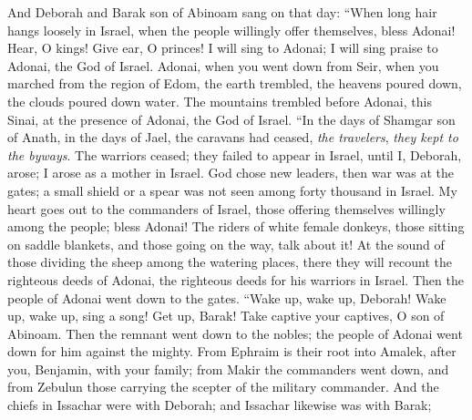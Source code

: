 \begin{biblechapter} %
 And Deborah and Barak son of Abinoam sang on that day:
\verse “When long hair hangs loosely in Israel, 
when the people willingly offer themselves, 
bless Adonai!
\verse Hear, O kings! Give ear, O princes! 
I will sing to Adonai; 
I will sing praise to Adonai, 
the God of Israel.
\verse Adonai, when you went down from Seir, 
when you marched from the region of Edom, 
the earth trembled, the heavens poured down, 
the clouds poured down water.
\verse The mountains trembled before Adonai, 
this Sinai, at the presence of Adonai, the God of Israel.
\verse “In the days of Shamgar son of Anath, 
in the days of Jael, the caravans had ceased, 
\textit{the travelers}, \textit{they kept to the byways}.
\verse The warriors ceased; 
they failed to appear in Israel, 
until I, Deborah, arose; 
I arose as a mother in Israel.
\verse God chose new leaders, 
then war was at the gates; 
a small shield or a spear was not seen 
among forty thousand in Israel.
\verse My heart goes out to the commanders of Israel, 
those offering themselves willingly among the people; 
bless Adonai!
\verse The riders of white female donkeys, 
those sitting on saddle blankets, 
and those going on the way, talk about it!
\verse At the sound of those dividing the sheep 
among the watering places, 
there they will recount the righteous deeds of Adonai, 
the righteous deeds for his warriors in Israel. 
Then the people of Adonai went down to the gates.
\verse “Wake up, wake up, Deborah! 
Wake up, wake up, sing a song! 
Get up, Barak! 
Take captive your captives, O son of Abinoam.
\verse Then the remnant went down to the nobles; 
the people of Adonai went down for him against the mighty.
\verse From Ephraim is their root into Amalek, 
after you, Benjamin, with your family; 
from Makir the commanders went down, 
and from Zebulun those carrying the scepter 
of the military commander.
\verse And the chiefs in Issachar were with Deborah; 
and Issachar likewise was with Barak; 

\end{biblechapter}
